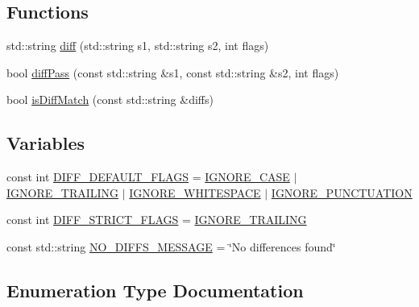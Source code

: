 \subsection*{Functions}
\begin{DoxyCompactItemize}
\item 
std\+::string \mbox{\hyperlink{namespacediff_a37f80e92da40347774327a755bdf4c93}{diff}} (std\+::string s1, std\+::string s2, int flags)
\item 
bool \mbox{\hyperlink{namespacediff_a68a39e10b40db02df1d941fe83cc9828}{diff\+Pass}} (const std\+::string \&s1, const std\+::string \&s2, int flags)
\item 
bool \mbox{\hyperlink{namespacediff_a02aeebb7bbdd2871ba3d5470721004e5}{is\+Diff\+Match}} (const std\+::string \&diffs)
\end{DoxyCompactItemize}
\subsection*{Variables}
\begin{DoxyCompactItemize}
\item 
const int \mbox{\hyperlink{namespacediff_a5044abd56bc89e814e2d953b8e8c0a65}{D\+I\+F\+F\+\_\+\+D\+E\+F\+A\+U\+L\+T\+\_\+\+F\+L\+A\+GS}} = \mbox{\hyperlink{namespacediff_ab3b1c38517a62ce7edefba7b93b406dda743829c4dd20c98f1a4db5f83106d839}{I\+G\+N\+O\+R\+E\+\_\+\+C\+A\+SE}} $\vert$ \mbox{\hyperlink{namespacediff_ab3b1c38517a62ce7edefba7b93b406dda4cf05931c8f25fb17d9f490c6bd67d70}{I\+G\+N\+O\+R\+E\+\_\+\+T\+R\+A\+I\+L\+I\+NG}} $\vert$ \mbox{\hyperlink{namespacediff_ab3b1c38517a62ce7edefba7b93b406ddab94634739aa9d0705e2eb7976a969a20}{I\+G\+N\+O\+R\+E\+\_\+\+W\+H\+I\+T\+E\+S\+P\+A\+CE}} $\vert$ \mbox{\hyperlink{namespacediff_ab3b1c38517a62ce7edefba7b93b406dda84e6a2f9f288157ed7a207dc744e1d46}{I\+G\+N\+O\+R\+E\+\_\+\+P\+U\+N\+C\+T\+U\+A\+T\+I\+ON}}
\item 
const int \mbox{\hyperlink{namespacediff_aada938db21bf68a19d23eca0fddc551b}{D\+I\+F\+F\+\_\+\+S\+T\+R\+I\+C\+T\+\_\+\+F\+L\+A\+GS}} = \mbox{\hyperlink{namespacediff_ab3b1c38517a62ce7edefba7b93b406dda4cf05931c8f25fb17d9f490c6bd67d70}{I\+G\+N\+O\+R\+E\+\_\+\+T\+R\+A\+I\+L\+I\+NG}}
\item 
const std\+::string \mbox{\hyperlink{namespacediff_a4f8bdb0eae6c54a481aba9358db1e9ab}{N\+O\+\_\+\+D\+I\+F\+F\+S\+\_\+\+M\+E\+S\+S\+A\+GE}} = \char`\"{}No differences found\char`\"{}
\end{DoxyCompactItemize}


\subsection{Enumeration Type Documentation}
\mbox{\label{namespacediff_ab3b1c38517a62ce7edefba7b93b406dd}} 
